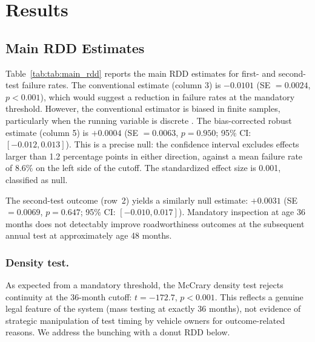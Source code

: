 \documentclass[12pt]{article}
\begin{document}


\section{Results}

\subsection{Main RDD Estimates}

Table~\ref{tab:tab:main_rdd} reports the main RDD estimates for first- and second-test failure rates. The conventional estimate (column 3) is $-0.0101$ (SE $= 0.0024$, $p < 0.001$), which would suggest a reduction in failure rates at the mandatory threshold. However, the conventional estimator is biased in finite samples, particularly when the running variable is discrete \citep{Calonico2014}. The bias-corrected robust estimate (column 5) is $+0.0004$ (SE $= 0.0063$, $p = 0.950$; 95\% CI: $[-0.012, 0.013]$). This is a precise null: the confidence interval excludes effects larger than 1.2 percentage points in either direction, against a mean failure rate of 8.6\% on the left side of the cutoff. The standardized effect size is 0.001, classified as null.

The second-test outcome (row~2) yields a similarly null estimate: $+0.0031$ (SE $= 0.0069$, $p = 0.647$; 95\% CI: $[-0.010, 0.017]$). Mandatory inspection at age 36 months does not detectably improve roadworthiness outcomes at the subsequent annual test at approximately age 48 months.



\subsubsection*{Density test.}
As expected from a mandatory threshold, the McCrary density test rejects continuity at the 36-month cutoff: $t = -172.7$, $p < 0.001$. This reflects a genuine legal feature of the system (mass testing at exactly 36 months), not evidence of strategic manipulation of test timing by vehicle owners for outcome-related reasons. We address the bunching with a donut RDD below.
\end{document}
